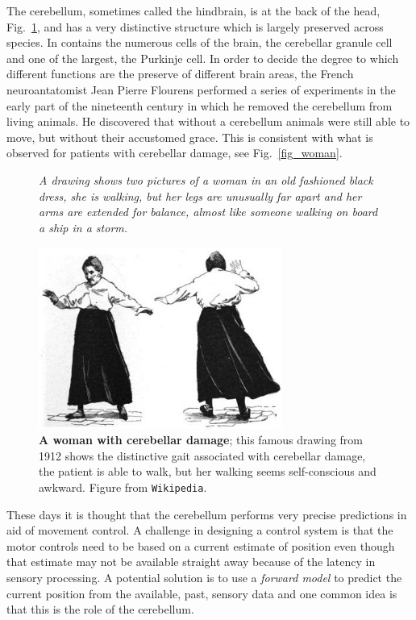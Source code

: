 \documentclass[12pt]{article}
\begin{document}
The cerebellum, sometimes called the hindbrain, is at the back of the
head, Fig.~\ref{fig_cerebellum}, and has a very distinctive structure
which is largely preserved across species. In contains the numerous
cells of the brain, the cerebellar granule cell and one of the
largest, the Purkinje cell. In order to decide the degree to which
different functions are the preserve of different brain areas, the
French neuroantatomist Jean Pierre Flourens performed a series of
experiments in the early part of the nineteenth century in which he
removed the cerebellum from living animals. He discovered that without
a cerebellum animals were still able to move, but without their
accustomed grace. This is consistent with what is observed for
patients with cerebellar damage, see Fig.~\ref{fig_woman}.

\begin{figure}[tbhp]
{\textsl{A drawing shows two pictures of a woman in an old fashioned black dress, she is walking, but her legs are unusually far apart and her arms are extended for balance, almost like someone walking on board a ship in a storm.}}
{
  \begin{center}
\includegraphics[width=8cm]{woman.png}
  \end{center}
  }
  \caption{\textbf{A woman with cerebellar damage}; this famous
    drawing from 1912 shows the distinctive gait associated with
    cerebellar damage, the patient is able to walk, but her walking
    seems self-conscious and awkward. Figure from
    \texttt{Wikipedia}.\label{fig_cerebellum}}
\end{figure}

These days it is thought that the cerebellum performs very precise
predictions in aid of movement control. A challenge in designing a control system is that the
motor controls need to be based on a current estimate of position even
though that estimate may not be available straight away because of the
latency in sensory processing. A potential solution is to use a
\textsl{forward model} to predict the current position from the
available, past, sensory data and one common idea is that this is the
role of the cerebellum.
\end{document}
